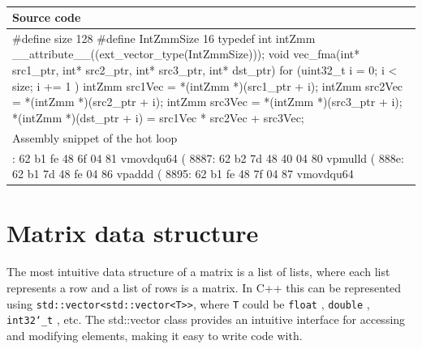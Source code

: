 \documentclass[logo,bsc,singlespacing,parskip]{infthesis}
\newcommand{\dtint}{\texttt{int32\char`_t} }
\newcommand{\dtfloat}{\texttt{float} }
\newcommand{\dtdouble}{\texttt{double} }
\newenvironment{VerbatimCompact}
  {\vspace*{-2.5mm}\VerbatimEnvironment
   \par\Verbatim}
  {\endVerbatim\vspace*{-2.4mm}}
\begin{document}
\begin{table}[H]\captionsetup{name=Listing}
\begin{tabular}{>{\raggedright\arraybackslash}p{14cm}}
    Source code\\
    \midrule
    \begin{VerbatimCompact}
#define size 128
#define IntZmmSize 16
typedef int intZmm __attribute__((ext_vector_type(IntZmmSize)));
void vec_fma(int* src1_ptr, int* src2_ptr,
             int* src3_ptr, int* dst_ptr) {
    for (uint32_t i = 0; i < size; i += 1 ){
        intZmm src1Vec = *(intZmm *)(src1_ptr + i);
        intZmm src2Vec = *(intZmm *)(src2_ptr + i);
        intZmm src3Vec = *(intZmm *)(src3_ptr + i);
        *(intZmm *)(dst_ptr + i) = src1Vec * src2Vec + src3Vec;
    }
}
    \end{VerbatimCompact}
    \\
    Assembly snippet of the hot loop\\
    \midrule
    \begin{VerbatimCompact}
8880: 62 b1 fe 48 6f 04 81  vmovdqu64 (%
8887: 62 b2 7d 48 40 04 80  vpmulld (%
888e: 62 b1 7d 48 fe 04 86  vpaddd (%
8895: 62 b1 fe 48 7f 04 87  vmovdqu64 %
    \end{VerbatimCompact}
    \\
\end{tabular}
\caption{}
\label{vec-fma-int-vecty}
\end{table}




\section{Matrix data structure}

The most intuitive data structure of a matrix is a list of lists, where each
list represents a row and a list of rows is a matrix. In C++ this can be
represented using \texttt{std::vector<std::vector<T>>}, where \texttt{T} could
be \dtfloat, \dtdouble, \dtint, etc. The std::vector
class provides an intuitive interface for accessing and modifying elements,
making it easy to write code with. 
\end{document}
